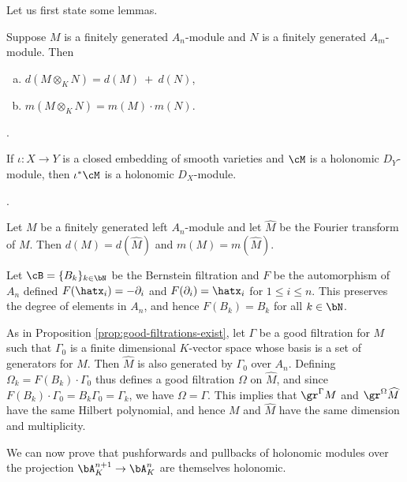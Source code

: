 Let us first state some lemmas.
\begin{lem}\label{lem:tensor-product-and-dimension}
	Suppose $M$ is a finitely generated $A_n$-module and $N$ is a finitely generated $A_m$-module. Then
	\begin{enumerate}[(a)]
		\item $d(M\otimes_K N) = d(M) ~+~ d(N)$,
		\item $m(M\otimes_K N) = m(M)\cdot m(N)$.
	\end{enumerate}
\end{lem}
\begin{prf}
	\cite[Theorem 13.4.1]{d-mod-primer}.
\end{prf}
\begin{lem}\label{lem:pullback-embedding-holonomic}
	If $\iota:X\to Y$ is a closed embedding of smooth varieties and $\cM$ is a holonomic $D_Y$-module, then $\iota^*\cM$ is a holonomic $D_X$-module.
\end{lem}
\begin{prf}
	\cite[Theorem 3.2.3 and Lemma 3.2.5]{d-mod_ps-rt}.
\end{prf}
\begin{lem}\label{lem:fourier-trans-dim}
	Let $M$ be a finitely generated left $A_n$-module and let $\widehat{M}$ be the Fourier transform of $M$. Then $d(M) = d(\widehat{M})$ and $m(M) = m(\widehat{M})$.
\end{lem}
\begin{prf}
	Let $\cB = \{B_k\}_{k\in \bN}$ be the Bernstein filtration and $F$ be the automorphism of $A_n$ defined $F(\hatx_i) = -\partial_i$ and $F(\partial_i) = \hatx_i$ for $1\leq i\leq n$. This preserves the degree of elements in $A_n$, and hence $F(B_k) = B_k$ for all $k \in \bN$.

	As in Proposition \ref{prop:good-filtrations-exist}, let $\Gamma$ be a good filtration for $M$ such that $\Gamma_0$ is a finite dimensional $K$-vector space whose basis is a set of generators for $M$. Then $\widehat{M}$ is also generated by $\Gamma_0$ over $A_n$. Defining $\Omega_k = F(B_k)\cdot \Gamma_0$ thus defines a good filtration $\Omega$ on $\widehat{M}$, and since $F(B_k)\cdot \Gamma_0 = B_k\Gamma_0 = \Gamma_k$, we have $\Omega = \Gamma$. This implies that $\gr^\Gamma M$ and $\gr^\Omega \widehat{M}$ have the same Hilbert polynomial, and hence $M$ and $\widehat{M}$ have the same dimension and multiplicity.
\end{prf}
We can now prove that pushforwards and pullbacks of holonomic modules over the projection $\bA_K^{n+1}\to \bA^n_K$ are themselves holonomic.


